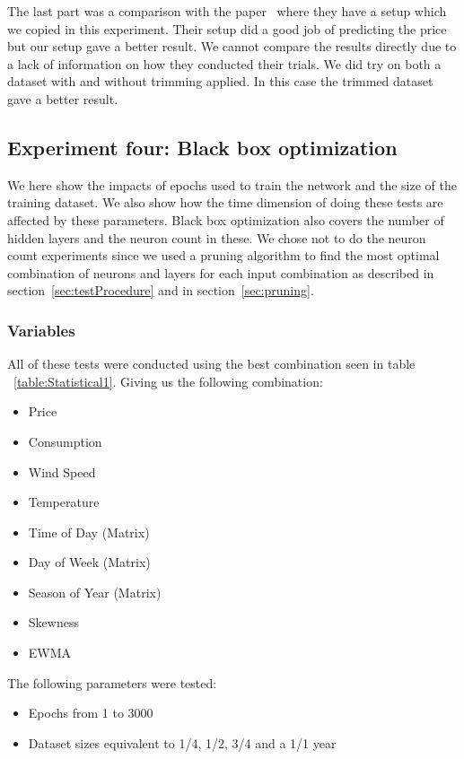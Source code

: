 The last part was a comparison with the paper~\cite{singhal2011electricity} where they have a setup which we copied in this experiment. Their setup did a good job of predicting the price but our setup gave a better result. We cannot compare the results directly due to a lack of information on how they conducted their trials. We did try on both a dataset with and without trimming applied. In this case the trimmed dataset gave a better result.

\newpage
\subsection{Experiment four: Black box optimization}
\label{sec:priceExperimentFour}
We here show the impacts of epochs used to train the network and the size of the training dataset. We also show how the time dimension of doing these tests are affected by these parameters. Black box optimization also covers the number of hidden layers and the neuron count in these. We chose not to do the neuron count experiments since we used a pruning algorithm to find the most optimal combination of neurons and layers for each input combination as described in section~\ref{sec:testProcedure} and in section~\ref{sec:pruning}.

\subsubsection{Variables}
All of these tests were conducted using the best combination seen in table ~\ref{table:Statistical1}. Giving us the following combination:
\begin{itemize}
	\item Price
	\item Consumption
	\item Wind Speed
	\item Temperature
	\item Time of Day (Matrix)
	\item Day of Week (Matrix)
	\item Season of Year (Matrix)
	\item Skewness
	\item EWMA
\end{itemize}

The following parameters were tested:

\begin{itemize}
	\item Epochs from 1 to 3000
	\item Dataset sizes equivalent to 1/4, 1/2, 3/4 and a 1/1 year
\end{itemize}

